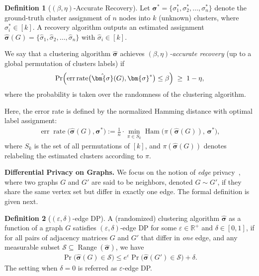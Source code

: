\documentclass[11pt]{article}
\theoremstyle{plain}
\theoremstyle{definition}
\newtheorem{definition}{Definition}
\theoremstyle{remark}
\begin{document}
\begin{definition}[$(\beta, \eta)$-Accurate Recovery] \label{def:error_rate}
Let $\bm{\sigma}^{*} = \{\sigma^{*}_{1}, \sigma^{*}_{2}, \ldots, \sigma^{*}_{n}\}$ denote the ground-truth cluster assignment of $n$ nodes into $k$ (unknown) clusters, where $\sigma^{*}_{i} \in [k]$.  
A recovery algorithm outputs an estimated assignment $\hat{\bm{\sigma}}(G) = \{\hat{\sigma}_{1}, \hat{\sigma}_{2}, \ldots, \hat{\sigma}_{n}\}$ with $\hat{\sigma}_{i} \in [k]$.  

We say that a clustering algorithm $\hat{\bm{\sigma}}$ achieves $(\beta, \eta)$\emph{-accurate recovery} (up to a global permutation of clusters labels) if
\begin{align}\label{eqn:beta_eta_accurate_definition}
\Pr\Bigl( \operatorname{err}\operatorname{rate}\bigl(\hat{\bm{\sigma}}(G), \bm{\sigma}^{*}\bigr) \leq \beta \Bigr) \;\geq\; 1 - \eta,
\end{align}
where the probability is taken over the randomness of the clustering algorithm.  

Here, the error rate is defined by the normalized Hamming distance with optimal label assignment:
\begin{align}
\operatorname{err}\operatorname{rate}\bigl(\hat{\bm{\sigma}}(G), \bm{\sigma}^{*}\bigr)
:=
\frac{1}{n}\cdot
\min_{\pi \in S_{k}}
\operatorname{Ham} \bigl(\pi(\hat{\bm{\sigma}}(G)),\, \bm{\sigma}^{*}\bigr), \nonumber 
\end{align}
where $S_{k}$ is the set of all permutations of $[k]$, and $\pi(\hat{\bm{\sigma}}(G))$ denotes relabeling the estimated clusters according to $\pi$.
\end{definition}

\textbf{Differential Privacy on Graphs.} We focus on the notion of \emph{edge} privacy~\citep{blocki2013differentially}, where two graphs $G$ and $G'$ are said to be neighbors, denoted $G \sim G'$, if they share the same vertex set but differ in exactly one edge. The formal definition is given next.


 \begin{definition} [$(\varepsilon, \delta)$-edge DP] \label{def:edgeDP}  A (randomized) clustering algorithm $\hat{\bm{\sigma}}$ as a function of a graph $G$ satisfies $(\varepsilon, \delta)$-edge DP for some $\varepsilon \in \mathds{R}^{+}$ and $\delta \in [0,1]$, if for all pairs of adjacency matrices $G$ and $G'$ that differ in {\it one} edge, and any measurable subset $\mathcal{S} \subseteq \operatorname{Range}(\hat{\bm{\sigma}})$, we have 
\begin{align*}%
    {\operatorname{Pr}(\hat{\bm{\sigma}}(G) \in \mathcal{S}}) \leq e^{\varepsilon} { \operatorname{Pr}(\hat{\bm{\sigma}}(G') \in \mathcal{S}}) + \delta.
\end{align*}
The setting when $\delta = 0$ is referred as $\varepsilon$-edge DP.
\end{definition} 
\end{document}

